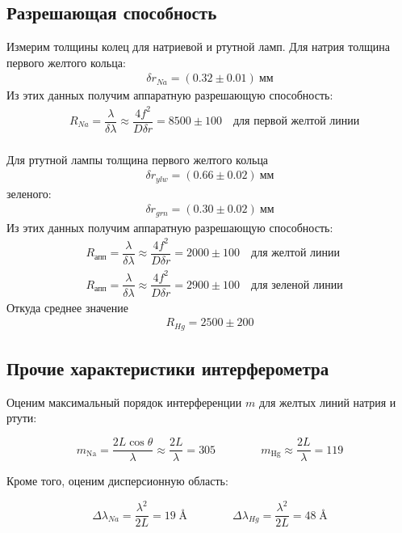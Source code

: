 \documentclass[a4paper,12pt]{article}
\theoremstyle{definition}
\begin{document}
\subsection{Разрешающая способность}
Измерим толщины колец для натриевой и ртутной ламп.
Для натрия толщина первого желтого кольца:
\begin{align*}
\delta r_{Na} = (0.32\pm0.01)\ \text{мм}
\end{align*} 
Из этих данных получим аппаратную разрешающую способность:  
\begin{align*}
  &R_{Na} = \dfrac{\lambda}{\delta \lambda} \approx \dfrac{4f^2}{D \delta r} = 8500 \pm 100 \quad \text{для первой желтой линии}\\
\end{align*}

Для ртутной лампы толщина первого желтого кольца 
\begin{align*}
\delta r_{ylw} = (0.66\pm0.02)\ \text{мм}
\end{align*}
зеленого: 
\begin{align*}
\delta r_{grn} = (0.30\pm0.02)\ \text{мм}
\end{align*}
Из этих данных получим аппаратную разрешающую способность:  
\begin{align*}
  &R_{\text{апп}} = \dfrac{\lambda}{\delta \lambda} \approx \dfrac{4f^2}{D \delta r} = 2000 \pm 100 \quad \text{для желтой линии}\\
  &R_{\text{апп}} = \dfrac{\lambda}{\delta \lambda} \approx \dfrac{4f^2}{D \delta r} = 2900 \pm 100 \quad \text{для зеленой линии}
\end{align*}
Откуда среднее значение
\begin{align*}
R_{Hg} = 2500 \pm 200
\end{align*}

\subsection{Прочие характеристики интерферометра}
Оценим максимальный порядок интерференции $m$ для желтых линий натрия и ртути:

$$ m_\text{Na} = \frac{2L \cos \theta}{\lambda} \approx \frac{2L}{\lambda} = 305 \qquad \qquad m_\text{Hg} \approx \frac{2L}{\lambda} = 119$$

Кроме того, оценим дисперсионную область:

$$ \Delta \lambda_{Na} = \frac{\lambda^2}{2 L}= 19 \; \text{\AA}  \qquad \qquad  \Delta \lambda_{Hg} = \frac{\lambda^2}{2 L}= 48 \; \text{\AA}$$
\end{document}
